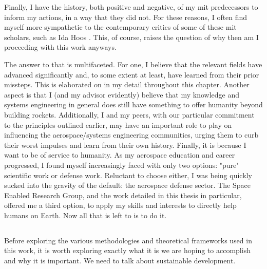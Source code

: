 Finally, I have the history, both positive and negative, of my \ac{mit} predecessors to inform my actions, in a way that they did not. For these reasons, I often find myself more sympathetic to the contemporary critics of some of these \ac{mit} scholars, such as Ida Hoos \cite{hoosSystemsAnalysisPublic1983}. This, of course, raises the question of why then am I proceeding with this work anyways.	

The answer to that is multifaceted. For one, I believe that the relevant fields have advanced significantly and, to some extent at least, have learned from their prior missteps. This is elaborated on in my detail throughout this chapter. Another aspect is that I (and my advisor evidently) believe that my knowledge and systems engineering in general does still have something to offer humanity beyond building rockets. Additionally, I and my peers, with our particular commitment to the principles outlined earlier, may have an important role to play on influencing the aerospace/systems engineering communities, urging them to curb their worst impulses and learn from their own history. Finally, it is because I want to be of service to humanity. As my aerospace education and career progressed, I found myself increasingly faced with only two options: "pure" scientific work or defense work. Reluctant to choose either, I was being quickly sucked into the gravity of the default: the aerospace defense sector. The Space Enabled Research Group, and the work detailed in this thesis in particular, offered me a third option, to apply my skills and interests to directly help humans on Earth. Now all that is left to is to do it.

\subsection{} \label{sec:sustainable_development}

Before exploring the various methodologies and theoretical frameworks used in this work, it is worth exploring exactly what it is we are hoping to accomplish and why it is important. We need to talk about sustainable development.
 
\subsubsection{} \label{sec:sustain}

